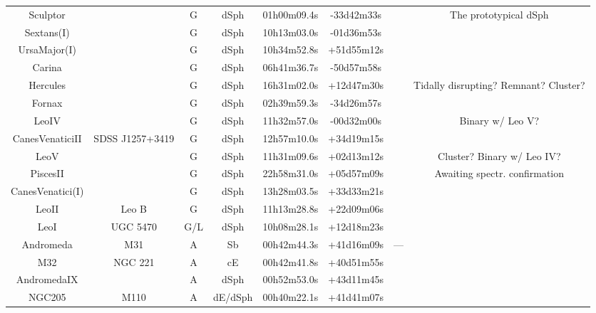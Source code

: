 \begin{table}
\begin{tabular}{cccccccc}
Sculptor              &                          & G & dSph & 01h00m09.4s & -33d42m33s &\cite{shapley1938a} & The prototypical dSph\\
Sextans(I)           &                          & G & dSph & 10h13m03.0s & -01d36m53s &\cite{irwin1990}&\\
UrsaMajor(I)        &                          & G & dSph & 10h34m52.8s & +51d55m12s &\cite{willman2005a}&\\
Carina                &                          & G & dSph & 06h41m36.7s & -50d57m58s &\cite{cannon1977}&\\
Hercules              &                          & G & dSph & 16h31m02.0s & +12d47m30s &\cite{belokurov2007} & Tidally disrupting? Remnant? Cluster?\\
Fornax                &                          & G & dSph & 02h39m59.3s & -34d26m57s &\cite{shapley1938b}&\\
LeoIV                &                          & G & dSph & 11h32m57.0s & -00d32m00s &\cite{belokurov2007} & Binary w/ Leo V?\\
CanesVenaticiII     & SDSS J1257+3419          & G & dSph & 12h57m10.0s & +34d19m15s &\cite{sakamoto2006}&\\
LeoV                 &                          & G & dSph & 11h31m09.6s & +02d13m12s &\cite{belokurov2008} & Cluster? Binary w/ Leo IV?\\
PiscesII             &                          & G & dSph & 22h58m31.0s & +05d57m09s &\cite{belokurov2010} & Awaiting spectr. confirmation\\
CanesVenatici(I)    &                          & G & dSph & 13h28m03.5s & +33d33m21s &\cite{zucker2006b}&\\
LeoII                & Leo B                    & G & dSph & 11h13m28.8s & +22d09m06s &\cite{harrington1950}&\\
LeoI                 & UGC 5470                 &G/L& dSph & 10h08m28.1s & +12d18m23s &\cite{harrington1950}&\\
Andromeda             & M31                      & A & Sb   & 00h42m44.3s & +41d16m09s & --- &\\
M32                   & NGC 221                  & A & cE   & 00h42m41.8s & +40d51m55s & \cite{legentil1755} &\\
AndromedaIX	      &                          & A & dSph & 00h52m53.0s & +43d11m45s &\cite{zucker2004a}&\\
NGC205               & M110                     & A &dE/dSph& 00h40m22.1s & +41d41m07s & \cite{messier1798} &\\

\end{tabular}
\end{table}
